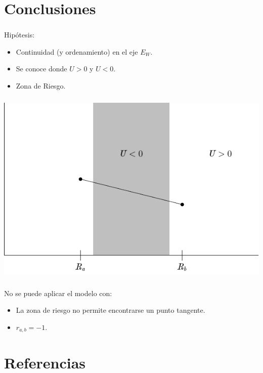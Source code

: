 \documentclass{beamer}
\begin{document}
\addtocounter{part}{1}

\section[3. Conclusiones.]{Conclusiones} %
\begin{frame}[t,fragile]
	\frametitle{\secname}
	\begin{alertblock}{ \centering Hipótesis:}
		\begin{itemize}
			\item Continuidad (y ordenamiento) en el eje \(E_W\).
			\item Se conoce donde \(U >0\) y \(U < 0\).
			\item Zona de Riesgo.
		\end{itemize}
	\end{alertblock}
\end{frame}

\begin{frame}[t,fragile]
	\frametitle{\secname}
		\includegraphics[width= 0.8 \linewidth]{IMAGES/4/4}
\end{frame}

\begin{frame}[t,fragile]
	\frametitle{\secname}
	\begin{alertblock}{\centering No se puede aplicar el modelo con:}
		\begin{itemize}
			\item La zona de riesgo no permite encontrarse un punto tangente.
			\item \(r_{a,b} = -1\).
		\end{itemize}
	\end{alertblock}
\end{frame}

\section{Referencias} %
\begin{frame}[t]
\frametitle{\secname}

\beamerdefaultoverlayspecification{}

\end{frame}
\end{document}
